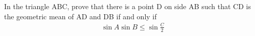 \item In the triangle ABC, prove that there is a point D on side AB such that CD is the geometric mean of AD and DB if and only if
\begin{align*}
\sin{A}\sin{B}\leq\sin{\frac{C}{2}}
\end{align*}

